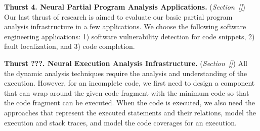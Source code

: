 \vspace{3pt}
\noindent \textbf{Thurst 4. Neural Partial Program Analysis
  Applications.}  ({\em Section~\ref{}}) Our last thrust of research
is aimed to evaluate our basic partial program analysis infrastructure
in a few applications. We choose the following software engineering
applications: 1) software vulnerability detection for code snippets,
2) fault localization, and 3) code completion.

\vspace{3pt}
\noindent \textbf{Thurst ???. Neural Execution Analysis Infrastructure.}
({\em Section~\ref{}}) All the dynamic analysis techniques require the
analysis and understanding of the execution. However, for an
incomplete code, we first need to design a component that can wrap
around the given code fragment with the minimum code so that the code
fragment can be executed. When the code is executed, we also need the
approaches that represent the executed statements and their relations,
model the execution and stack traces, and model the code coverages
for an execution.





